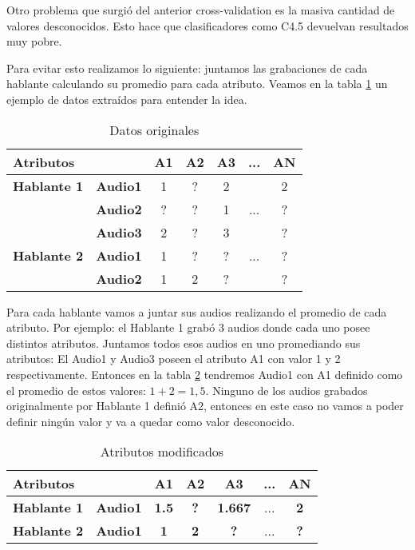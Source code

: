 Otro problema que surgió del anterior cross-validation es la masiva cantidad de valores desconocidos. Esto hace que clasificadores como C4.5 devuelvan resultados muy pobre. 

Para evitar esto realizamos lo siguiente: juntamos las grabaciones de cada hablante calculando su promedio para cada atributo. Veamos en la tabla \ref{datos_orig} un ejemplo de datos extraídos para entender la idea. 

\begin{table}[H]
	\centering
	\begin{tabular}{|l|l|ccccc|}
		\hline
		\multicolumn{2}{|l|}{Atributos} & A1 & A2 & A3 & ... & AN \\
		\hline 
		\textbf{Hablante 1} & \textbf{Audio1} & 1 & ? & 2 & & 2\\
		& \textbf{Audio2} & ? & ? & 1 & ... & ? \\
		& \textbf{Audio3} & 2 & ? & 3 & & ? \\
		\hline
		\textbf{Hablante 2} & \textbf{Audio1} & 1 & ? & ? & ... & ? \\
		& \textbf{Audio2} & 1 & 2 & ? & & ? \\
		\hline
	\end{tabular}
	\caption{Datos originales}
	\label{datos_orig}
\end{table}

Para cada hablante vamos a juntar sus audios realizando el promedio de cada atributo. Por ejemplo: el Hablante 1 grabó 3 audios donde cada uno posee distintos atributos. Juntamos todos esos audios en uno promediando sus atributos: El Audio1 y Audio3 poseen el atributo A1 con valor 1 y 2 respectivamente. Entonces en la tabla \ref{datos_comb} tendremos Audio1 con A1 definido como el promedio de estos valores: $1 + 2 = 1,5$. Ninguno de los audios grabados originalmente por Hablante 1 definió A2, entonces en este caso no vamos a poder definir ningún valor y va a quedar como valor desconocido. 

\begin{table}[H]
	\centering
	\begin{tabular}{|l|l|ccccc|}
		\hline
		\multicolumn{2}{|l|}{Atributos} & A1 & A2 & A3 & ... & AN \\
		\hline 
		\textbf{Hablante 1} & \textbf{Audio1} & \textbf{1.5} & \textbf{?} & \textbf{1.667} & ... & \textbf{2}\\
		\hline
		\textbf{Hablante 2} & \textbf{Audio1} & \textbf{1} & \textbf{2} & \textbf{?} & ... & \textbf{?} \\
		\hline
	\end{tabular}
	\caption{Atributos modificados}
	\label{datos_comb}
\end{table}

